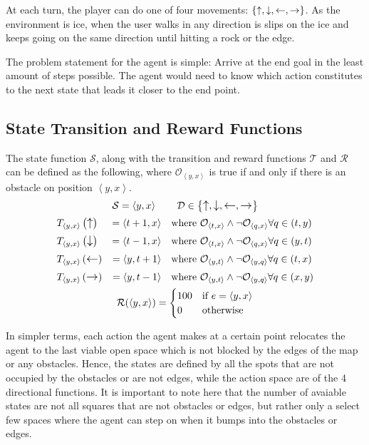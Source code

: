 At each turn, the player can do one of four movements: $\{\upa, \downa, \lefta, \righta\}$.
As the environment is ice, when the user walks in any direction is slips on the ice and keeps going on the same direction until hitting a rock or the edge.

The problem statement for the agent is simple: Arrive at the end goal in the least amount of steps possible. The agent would need to know which action constitutes to the next state that leads it closer to the end point.

\newcommand{\coor}[2]{\left\langle #1, #2 \right\rangle}
\newcommand{\yx}{\coor{y}{x}}
\newcommand{\obs}{\mathcal{O}}
\newcommand{\state}{\mathcal{S}}
\newcommand{\reward}{\mathcal{R}}

\subsection{State Transition and Reward Functions}
The state function $\state$, along with the transition and reward functions $\mathcal{T}$ and $\reward$ can be defined as the following, where $\obs_{\yx}$ is true if and only if there is an obstacle on position $\yx$.
\begin{gather*}
	\state = \yx \qquad \mathcal{D} \in \left\{ \upa, \downa, \lefta, \righta \right\} \\
	\begin{aligned}
		&T_{\yx}\left(\upa\right) &= \coor{t + 1}{x} &&&\text{where } \obs_{\coor{t}{x}} \wedge \neg \obs_{\coor{q}{x}} \forall q \in \left(t, y\right) \\
		&T_{\yx}\left(\downa\right) &= \coor{t - 1}{x} &&&\text{where } \obs_{\coor{t}{x}} \wedge \neg \obs_{\coor{q}{x}} \forall q \in \left(y, t\right) \\
		&T_{\yx}\left(\lefta\right) &= \coor{y}{t + 1} &&&\text{where } \obs_{\coor{y}{t}} \wedge \neg \obs_{\coor{y}{q}} \forall q \in \left(t, x\right) \\
		&T_{\yx}\left(\righta\right) &= \coor{y}{t - 1} &&&\text{where } \obs_{\coor{y}{t}} \wedge \neg \obs_{\coor{y}{q}} \forall q \in \left(x, y\right)
	\end{aligned} \\
	\reward(\yx) = \begin{cases}
		100 & \text{if } e = \yx \\
		0 & \text{otherwise}
	\end{cases}
\end{gather*}

In simpler terms, each action the agent makes at a certain point relocates the agent to the last viable open space which is not blocked by the edges of the map or any obstacles. Hence, the states are defined by all the spots that are not occupied by the obstacles or are not edges, while the action space are of the 4 directional functions. It is important to note here that the number of avaiable states are not all squares that are not obstacles or edges, but rather only a select few spaces where the agent can step on when it bumps into the obstacles or edges.

